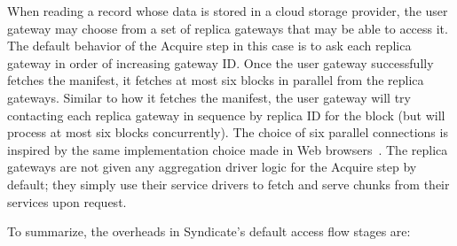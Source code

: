 When reading a record whose data is stored in a cloud storage provider, the user
gateway may choose from a set of replica gateways that may be able to access it.
The default behavior of the Acquire step in this case is to ask each replica
gateway in order of increasing gateway ID.  Once the user gateway successfully
fetches the manifest, it fetches at most six blocks in parallel from the replica
gateways.  Similar to how it fetches the manifest, the user gateway will try
contacting each replica gateway in sequence by replica ID for the block (but
will process at most six blocks concurrently).
The choice of six parallel connections is inspired by the same implementation choice made in Web
browsers~\cite{browserscope-browsertest}.  %
The replica gateways are not given any aggregation driver logic for the Acquire
step by default; they simply use their service drivers to fetch and serve chunks
from their services upon request.

To summarize, the overheads in Syndicate's default access flow stages are:

